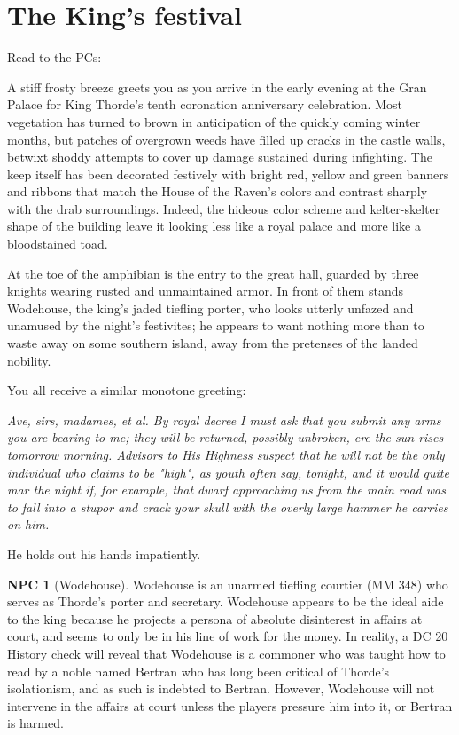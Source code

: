 \documentclass{report}
\theoremstyle{definition}
\newtheorem{npc}{NPC}[chapter]
\begin{document}
\section{The King's festival}
Read to the PCs:
\begin{displayquote}
A stiff frosty breeze greets you as you arrive in the early evening at the Gran Palace for King Thorde's tenth coronation anniversary celebration.  Most vegetation has turned to brown in anticipation of the quickly coming winter months, but patches of overgrown weeds have filled up cracks in the castle walls, betwixt shoddy attempts to cover up damage sustained during infighting. The keep itself has been decorated festively with bright red, yellow and green banners and ribbons that match the House of the Raven's colors and contrast sharply with the drab surroundings. Indeed, the hideous color scheme and kelter-skelter shape of the building leave it looking less like a royal palace and more like a bloodstained toad.

At the toe of the amphibian is the entry to the great hall, guarded by three knights wearing rusted and unmaintained armor. In front of them stands Wodehouse, the king's jaded tiefling porter, who looks utterly unfazed and unamused by the night's festivites; he appears to want nothing more than to waste away on some southern island, away from the pretenses of the landed nobility.	

You all receive a similar monotone greeting:

\textit{Ave, sirs, madames, et al. By royal decree I must ask that you submit any arms you are bearing to me; they will be returned, possibly unbroken, ere the sun rises tomorrow morning. Advisors to His Highness suspect that he will not be the only individual who claims to be "high", as youth often say, tonight, and it would quite mar the night if, for example, that dwarf approaching us from the main road was to fall into a stupor and crack your skull with the overly large hammer he carries on him.}

He holds out his hands impatiently.

\end{displayquote}
\begin{npc}[Wodehouse]
Wodehouse is an unarmed tiefling courtier (MM 348) who serves as Thorde's porter and secretary. Wodehouse appears to be the ideal aide to the king because he projects a persona of absolute disinterest in affairs at court, and seems to only be in his line of work for the money. In reality, a DC 20 History check will reveal that Wodehouse is a commoner who was taught how to read by a noble named Bertran who has long been critical of Thorde's isolationism, and as such is indebted to Bertran. However, Wodehouse will not intervene in the affairs at court unless the players pressure him into it, or Bertran is harmed.
\end{npc}
\end{document}
